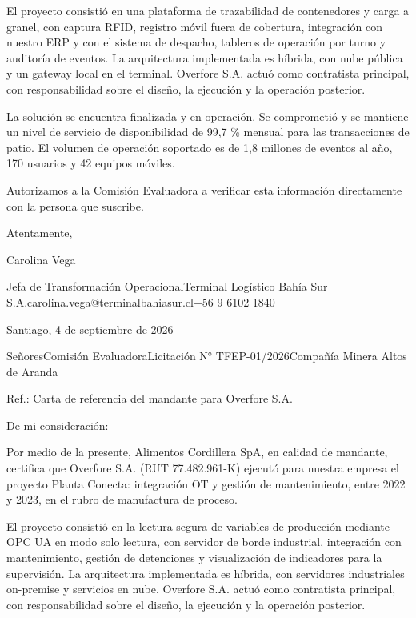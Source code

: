 \documentclass[anexo]{../../comun/overfore}
\begin{document}
El proyecto consistió en una plataforma de trazabilidad de contenedores y carga a granel, con captura RFID, registro móvil fuera de cobertura, integración con nuestro ERP y con el sistema de despacho, tableros de operación por turno y auditoría de eventos. La arquitectura implementada es híbrida, con nube pública y un gateway local en el terminal. Overfore S.A. actuó como contratista principal, con responsabilidad sobre el diseño, la ejecución y la operación posterior.

La solución se encuentra finalizada y en operación. Se comprometió y se mantiene un nivel de servicio de disponibilidad de 99,7 \% mensual para las transacciones de patio. El volumen de operación soportado es de 1,8 millones de eventos al año, 170 usuarios y 42 equipos móviles.

Autorizamos a la Comisión Evaluadora a verificar esta información directamente con la persona que suscribe.

Atentamente,

Carolina Vega

Jefa de Transformación Operacional\newline Terminal Logístico Bahía Sur S.A.\newline carolina.vega@terminalbahiasur.cl\newline +56 9 6102 1840

\enlargethispage{4\baselineskip}
Santiago, 4 de septiembre de 2026

Señores\newline Comisión Evaluadora\newline Licitación N° TFEP-01/2026\newline Compañía Minera Altos de Aranda

Ref.: Carta de referencia del mandante para Overfore S.A.

De mi consideración:

Por medio de la presente, Alimentos Cordillera SpA, en calidad de mandante, certifica que Overfore S.A. (RUT 77.482.961-K) ejecutó para nuestra empresa el proyecto Planta Conecta: integración OT y gestión de mantenimiento, entre 2022 y 2023, en el rubro de manufactura de proceso.

El proyecto consistió en la lectura segura de variables de producción mediante OPC UA en modo solo lectura, con servidor de borde industrial, integración con mantenimiento, gestión de detenciones y visualización de indicadores para la supervisión. La arquitectura implementada es híbrida, con servidores industriales on-premise y servicios en nube. Overfore S.A. actuó como contratista principal, con responsabilidad sobre el diseño, la ejecución y la operación posterior.
\end{document}
